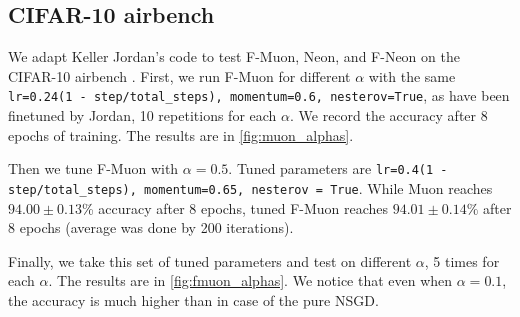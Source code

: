 \documentclass{article} %
\begin{document}
    
    \subsection{CIFAR-10 airbench}
    We adapt Keller Jordan's code to test F-Muon, Neon, and F-Neon on the CIFAR-10 airbench \citep{cifar2023airbench}.
    First, we run F-Muon for different $\alpha$ with the same {\tt lr=0.24(1 - step/total\_steps), momentum=0.6, nesterov=True}, as have been finetuned by Jordan, 10 repetitions for each $\alpha$. We record the accuracy after 8 epochs of training. The results are in \cref{fig:muon_alphas}.

    Then we tune F-Muon with $\alpha = 0.5$. Tuned parameters are {\tt lr=0.4(1 - step/total\_steps), momentum=0.65, nesterov = True}. While Muon reaches $94.00 \pm 0.13$\% accuracy after 8 epochs, tuned F-Muon reaches $94.01 \pm 0.14\%$ after 8 epochs (average was done by 200 iterations).

    Finally, we take this set of tuned parameters and test on different $\alpha$, 5 times for each $\alpha$. The results are in \cref{fig:fmuon_alphas}. We notice that even when $\alpha=0.1$, the accuracy is much higher than in case of the pure NSGD.
\end{document}
